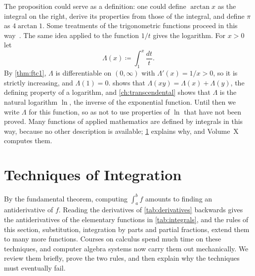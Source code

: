 The proposition could serve as a definition: one could define $\arctan x$ as the integral on the right, derive its properties from those of the integral, and define $\pi$ as $4\arctan1$. Some treatments of the trigonometric functions proceed in this way~\cite{spivak2008calculus}. The same idea applied to the function $1/t$ gives the logarithm. For $x>0$ let
\begin{equation}
\Lambda(x)\coloneqq\int_1^x\frac{dt}t .
\label{eq:log-integral}
\end{equation}
By \cref{thm:ftc1}, $\Lambda$ is differentiable on $(0,\infty)$ with $\Lambda'(x)=1/x>0$, so it is strictly increasing, and $\Lambda(1)=0$.  shows that $\Lambda(xy)=\Lambda(x)+\Lambda(y)$, the defining property of a logarithm, and \cref{ch:transcendental} shows that $\Lambda$ is the natural logarithm $\ln$, the inverse of the exponential function. Until then we write $\Lambda$ for this function, so as not to use properties of $\ln$ that have not been proved. Many functions of applied mathematics are defined by integrals in this way, because no other description is available; \cref{sec:techniques} explains why, and Volume~X computes them.

\section{Techniques of Integration}
\label{sec:techniques}

By the fundamental theorem, computing $\int_a^bf$ amounts to finding an antiderivative of $f$. Reading the derivatives of \cref{tab:derivatives} backwards gives the antiderivatives of the elementary functions in \cref{tab:integrals}, and the rules of this section, substitution, integration by parts and partial fractions, extend them to many more functions. Courses on calculus spend much time on these techniques, and computer algebra systems now carry them out mechanically. We review them briefly, prove the two rules, and then explain why the techniques must eventually fail.

